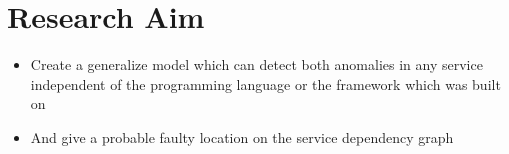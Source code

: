 \section{Research Aim}

\begin{itemize}
\item Create a generalize model which can detect both anomalies in any service independent of the programming language or the framework which was built on
\item And give a probable faulty location on the service dependency graph
\end{itemize}
